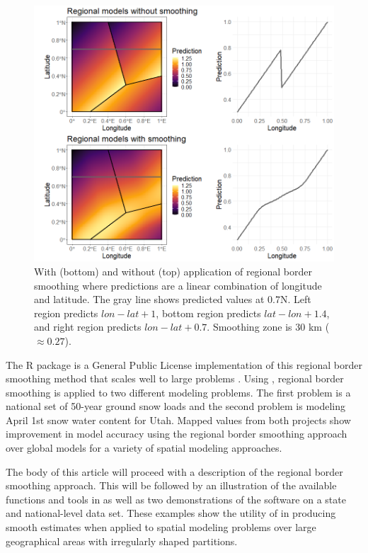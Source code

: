 \begin{figure}[htbp]
    \centering
    \includegraphics[width = \textwidth]{figures/example.png}
    \caption{With (bottom) and without (top) application of regional border smoothing where predictions are a linear combination of longitude and latitude. The gray line shows predicted values at 0.7\textdegree N. Left region predicts $lon - lat + 1$, bottom region predicts $lat - lon + 1.4$, and right region predicts $lon - lat + 0.7$. Smoothing zone is 30 km ($\approx 0.27$\textdegree).}
    \label{fig:example}
\end{figure}

The R package  is a General Public License implementation of this regional border smoothing method that scales well to large problems \citep{remap}. Using , regional border smoothing is applied to two different modeling problems. The first problem is a national set of 50-year ground snow loads and the second problem is modeling April 1st snow water content for Utah. Mapped values from both projects show improvement in model accuracy using the regional border smoothing approach over global models for a variety of spatial modeling approaches.

The body of this article will proceed with a description of the regional border smoothing approach. This will be followed by an illustration of the available functions and tools in  as well as two demonstrations of the software on a state and national-level data set. These examples show the utility of  in producing smooth estimates when applied to spatial modeling problems over large geographical areas with irregularly shaped partitions.

